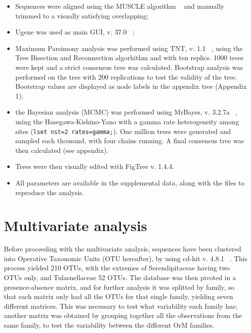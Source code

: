 \begin{itemize}
\item Sequences were aligned using the MUSCLE algorithm ~\citep{edgar2004} and manually trimmed to a visually satisfying overlapping;

\item Ugene was used as main GUI, v. 37.0 ~\citep{okonechnikov2012};

\item Maximum Parsimony analysis was performed using TNT, v. 1.1 ~\citep{tnt}, using the Tree Bisection and Reconnection algorhithm and with ten replics. 1000 trees were kept and a strict consensus tree was calculated. Bootstrap analysis was performed on the tree with 200 replications to test the validity of the tree. Bootstrap values are displayed as node labels in the appendix tree (Appendix 1);

\item the Bayesian analysis (MCMC) was performed using MrBayes, v. 3.2.7a ~\citep{huelsenbeck2001}, using the Hasegawa-Kishino-Yano with a gamma rate heterogeneity among sites (\texttt{lset nst=2 rates=gamma;}). One million trees were generated and sampled each thousand, with four chains running. A final consensus tree was then calculated (see appendix).

\item Trees were then visually edited with FigTree v. 1.4.4.

\item All parameters are available in the supplemental data, along with the files to reproduce the analysis.

\end{itemize}

\chapter{Multivariate analysis}
\label{multivariateanalysis}

Before proceeding with the multivariate analysis, sequences have been clustered into Operative Taxonomic Units (OTU hereafter), by using cd-hit v. 4.8.1 ~\citep{li2001}. This process yielded 210 OTUs, with the extremes of Serendipitaceae having two OTUs only, and Tulasnellaceae 52 OTUs.
The database was then pivoted in a presence-absence matrix, and for further analysis it was splitted by family, so that each matrix only had all the OTUs for that single family, yielding seven different matrices. This was necessary to test what variability each family has; another matrix was obtained by grouping together all the observations from the same family, to test the variability between the different OrM families.

